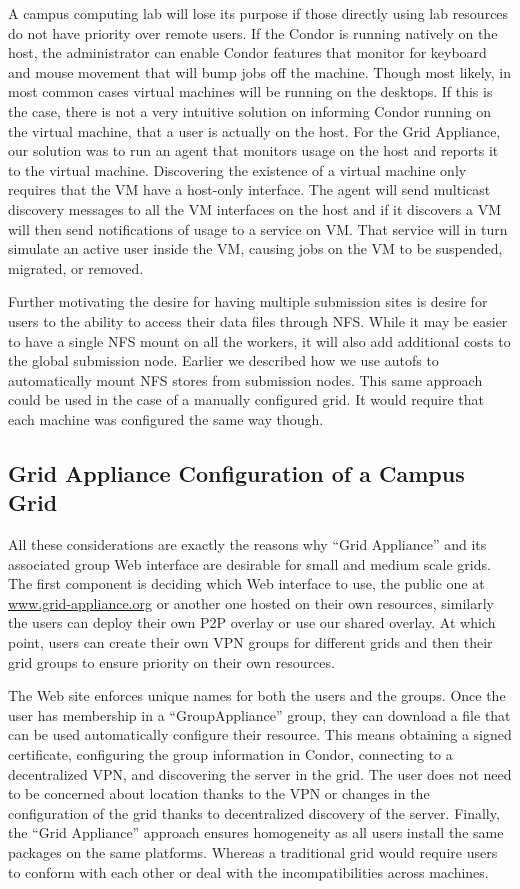 \documentclass[conference]{IEEEtran}
\begin{document}
A campus computing lab will lose its purpose if those directly using lab
resources do not have priority over remote users.  If the Condor is running
natively on the host, the administrator can enable Condor features that monitor
for keyboard and mouse movement that will bump jobs off the machine.  Though
most likely, in most common cases virtual machines will be running on the
desktops.  If this is the case, there is not a very intuitive solution on
informing Condor running on the virtual machine, that a user is actually on the
host.  For the Grid Appliance, our solution was to run an agent that monitors
usage on the host and reports it to the virtual machine.  Discovering the
existence of a virtual machine only requires that the VM have a host-only
interface.  The agent will send multicast discovery messages to all the VM
interfaces on the host and if it discovers a VM will then send notifications of
usage to a service on VM.  That service will in turn simulate an active user
inside the VM, causing jobs on the VM to be suspended, migrated, or removed.

Further motivating the desire for having multiple submission sites is desire
for users to the ability to access their data files through NFS.  While it may
be easier to have a single NFS mount on all the workers, it will also add
additional costs to the global submission node.  Earlier we described how we
use autofs to automatically mount NFS stores from submission nodes.  This same
approach could be used in the case of a manually configured grid.  It would
require that each machine was configured the same way though.

\subsection{Grid Appliance Configuration of a Campus Grid}

All these considerations are exactly the reasons why ``Grid Appliance'' and its
associated group Web interface are desirable for small and medium scale grids.
The first component is deciding which Web interface to use, the public one at
\url{www.grid-appliance.org} or another one hosted on their own resources,
similarly the users can deploy their own P2P overlay or use our shared overlay.
At which point, users can create their own VPN groups for different grids and
then their grid groups to ensure priority on their own resources.

The Web site enforces unique names for both the users and the groups.  Once the
user has membership in a ``GroupAppliance'' group, they can download a file
that can be used automatically configure their resource.  This means obtaining
a signed certificate, configuring the group information in Condor, connecting
to a decentralized VPN, and discovering the server in the grid.  The user does
not need to be concerned about location thanks to the VPN or changes in the
configuration of the grid thanks to decentralized discovery of the server.
Finally, the ``Grid Appliance'' approach ensures homogeneity as all users
install the same packages on the same platforms.  Whereas a traditional grid
would require users to conform with each other or deal with the
incompatibilities across machines.
\end{document}
